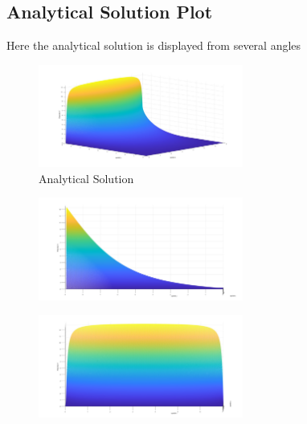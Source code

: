 \documentclass{amsart}
\begin{document}
\subsection{Analytical Solution Plot} 

Here the analytical solution is displayed from several angles 

\begin{figure}[H]
	\caption{Analytical Solution}
	\label{analsol}
    \includegraphics[width=0.6\textwidth]{Asol1.jpg}
\end{figure}
\begin{figure}[H]
    \includegraphics[width=0.6\textwidth]{Asol2.jpg}
\end{figure}
\begin{figure}[H]
    \includegraphics[width=0.6\textwidth]{Asol3.jpg}  
\end{figure}
\end{document}
